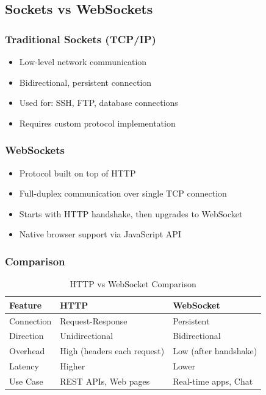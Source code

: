 \documentclass[12pt,a4paper]{article}
\begin{document}
\subsection{Sockets vs WebSockets}

\subsubsection{Traditional Sockets (TCP/IP)}
\begin{itemize}
    \item Low-level network communication
    \item Bidirectional, persistent connection
    \item Used for: SSH, FTP, database connections
    \item Requires custom protocol implementation
\end{itemize}

\subsubsection{WebSockets}
\begin{itemize}
    \item Protocol built on top of HTTP
    \item Full-duplex communication over single TCP connection
    \item Starts with HTTP handshake, then upgrades to WebSocket
    \item Native browser support via JavaScript API
\end{itemize}

\subsubsection{Comparison}
\begin{table}[H]
\centering
\begin{tabular}{|l|l|l|}
\hline
\textbf{Feature} & \textbf{HTTP} & \textbf{WebSocket} \\
\hline
Connection & Request-Response & Persistent \\
Direction & Unidirectional & Bidirectional \\
Overhead & High (headers each request) & Low (after handshake) \\
Latency & Higher & Lower \\
Use Case & REST APIs, Web pages & Real-time apps, Chat \\
\hline
\end{tabular}
\caption{HTTP vs WebSocket Comparison}
\end{table}
\end{document}
